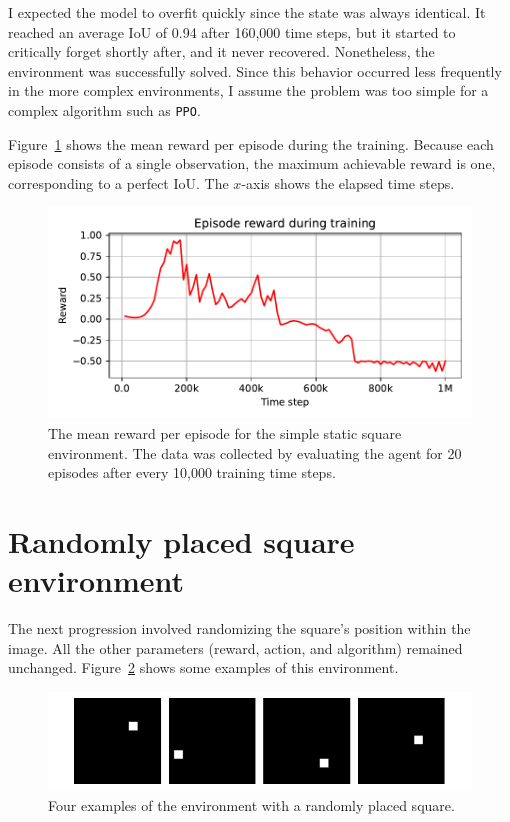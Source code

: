 \documentclass[
  digital,     %
  oneside,     %
  nosansbold,  %
  nocolorbold, %
  lof,         %
  lot,         %
]{fithesis4}
\begin{document}
I expected the model to overfit quickly since the state was always identical. It reached an average IoU of 0.94 after 160,000 time steps, but it started to critically forget shortly after, and it never recovered. Nonetheless, the environment was successfully solved. Since this behavior occurred less frequently in the more complex environments, I assume the problem was too simple for a complex algorithm such as \texttt{PPO}.

Figure~\ref{fig:v0_rew} shows the mean reward per episode during the training. Because each episode consists of a single observation, the maximum achievable reward is one, corresponding to a perfect IoU. The $x$-axis shows the elapsed time steps.

\begin{figure}
    \includegraphics[width=1\linewidth]{graphs/v0.pdf}
    \caption{The mean reward per episode for the simple static square environment. The data was collected by evaluating the agent for 20 episodes after every 10,000 training time steps.}
    \label{fig:v0_rew}
\end{figure}

\section{Randomly placed square environment}
The next progression involved randomizing the square's position within the image. All the other parameters (reward, action, and algorithm) remained unchanged. Figure~\ref{fig:env1} shows some examples of this environment.

\begin{figure}[h]
    \includegraphics[width=1\linewidth]{env_examples/env1.pdf}
    \caption{Four examples of the environment with a randomly placed square.}
    \label{fig:env1}
\end{figure}
\end{document}

